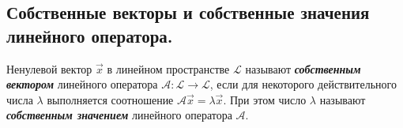 \subsection{
    Собственные векторы и собственные значения линейного оператора.
}

\begin{definition}
    Ненулевой вектор $\vec{x}$ в линейном пространстве $\mathcal{L}$ называют \textbf{\textit{собственным вектором}} линейного оператора $\mathscr{A}\colon \mathcal{L} \to \mathcal{L}$, если для некоторого действительного числа $\lambda$ выполняется соотношение $\mathscr{A}\vec{x} = \lambda\vec{x}$. При этом число $\lambda$ называют \textbf{\textit{собственным значением}} линейного оператора $\mathscr{A}$.
\end{definition}
